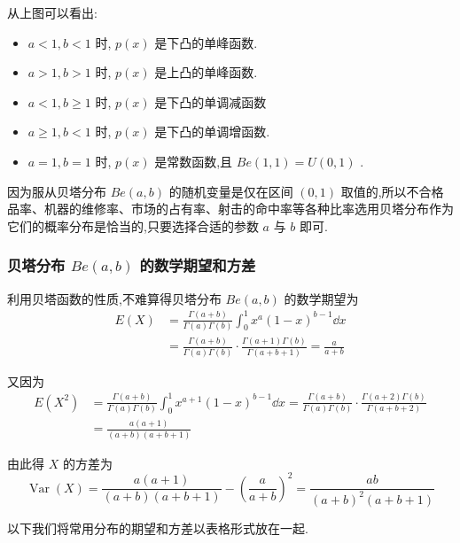 从上图可以看出:
\begin{itemize}
	\item $ a<1,b<1 $ 时, $ p(x) $ 是下凸的单峰函数.
	\item $ a>1,b>1 $ 时, $ p(x) $ 是上凸的单峰函数.
	\item $ a<1,b \geqslant 1 $ 时, $ p(x) $ 是下凸的单调减函数
	\item $ a \geqslant 1, b<1 $ 时, $ p(x) $ 是下凸的单调增函数.
	\item $ a=1,b=1 $ 时, $ p(x) $ 是常数函数,且 $ Be(1,1)=U(0,1) $ .
\end{itemize}

因为服从贝塔分布 $ Be(a,b) $ 的随机变量是仅在区间 $ (0,1) $ 取值的,所以不合格品率、机器的维修率、市场的占有率、射击的命中率等各种比率选用贝塔分布作为它们的概率分布是恰当的,只要选择合适的参数 $ a $ 与 $ b $ 即可.

\subsubsection{贝塔分布 $ Be(a,b) $ 的数学期望和方差}

利用贝塔函数的性质,不难算得贝塔分布 $ Be(a,b) $ 的数学期望为
\[
\begin{aligned} E(X) &=\frac{\Gamma(a+b)}{\Gamma(a) \Gamma(b)} \int_{0}^{1} x^{a}(1-x)^{b-1} \dd x \\ &=\frac{\Gamma(a+b)}{\Gamma(a) \Gamma(b)} \cdot \frac{\Gamma(a+1) \Gamma(b)}{\Gamma(a+b+1)}=\frac{a}{a+b} \end{aligned}
\]

又因为
\[
\begin{aligned} E\left(X^{2}\right) &=\frac{\Gamma(a+b)}{\Gamma(a) \Gamma(b)} \int_{0}^{1} x^{a+1}(1-x)^{b-1} \dd x=\frac{\Gamma(a+b)}{\Gamma(a) \Gamma(b)} \cdot \frac{\Gamma(a+2) \Gamma(b)}{\Gamma(a+b+2)} \\ &=\frac{a(a+1)}{(a+b)(a+b+1)} \end{aligned}
\]

由此得 $ X $ 的方差为
\[
\operatorname{Var}(X)=\frac{a(a+1)}{(a+b)(a+b+1)}-\left(\frac{a}{a+b}\right)^{2}=\frac{a b}{(a+b)^{2}(a+b+1)}
\]

以下我们将常用分布的期望和方差以表格形式放在一起.

